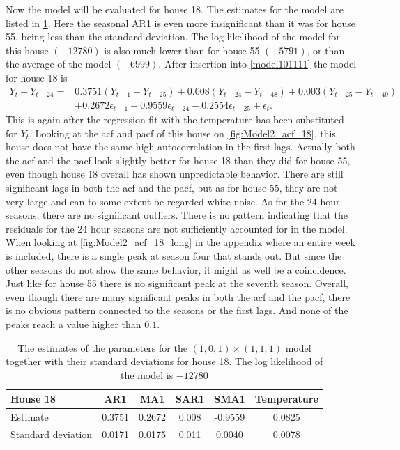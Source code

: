 \noindent Now the model will be evaluated for house 18. The estimates for the model are listed in \cref{tab:ParamSig_House18}. Here the seasonal AR1 is even more insignificant than it was for house 55, being less than the standard deviation. The log likelihood of the model for this house $(-12780)$ is also much lower than for house 55 $(-5791)$, or than the average of the model $(-6999)$. After insertion into \cref{model101111} the model for house 18 is
\begin{align}
    Y_t-Y_{t-24} = &0.3751 (Y_{t-1}-Y_{t-25}) + 0.008 (Y_{t-24}-Y_{t-48}) + 0.003 (Y_{t-25}-Y_{t-49}) \\  &+ 0.2672 \epsilon_{t-1} - 0.9559 \epsilon_{t-24} - 0.2554 \epsilon_{t-25} + \epsilon_t. \nonumber
\end{align}
This is again after the regression fit with the temperature has been substituted for $Y_t$. Looking at the acf and pacf of this house on \cref{fig:Model2_acf_18}, this house does not have the same high autocorrelation in the first lags. Actually both the acf and the pacf look slightly better for house 18 than they did for house 55, even though house 18 overall has shown unpredictable behavior. There are still significant lags in both the acf and the pacf, but as for house 55, they are not very large and can to some extent be regarded white noise. As for the 24 hour seasons, there are no significant outliers. There is no pattern indicating that the residuals for the 24 hour seasons are not sufficiently accounted for in the model. When looking at \cref{fig:Model2_acf_18_long} in the appendix where an entire week is included, there is a single peak at season four that stands out. But since the other seasons do not show the same behavior, it might as well be a coincidence. Just like for house 55 there is no significant peak at the seventh season. Overall, even though there are many significant peaks in both the acf and the pacf, there is no obvious pattern connected to the seasons or the first lags. And none of the peaks reach a value higher than $0.1$.

 \begin{table}[]
    \centering
    \begin{tabular}{l|ccccc}
    \hline
    \textbf{House 18} & \textbf{AR1} & \textbf{MA1} & \textbf{SAR1} & \textbf{SMA1} & \textbf{Temperature} \\ \hline \hline
    Estimate           & 0.3751 & 0.2672 & 0.008 & -0.9559 & 0.0825      \\
    Standard deviation & 0.0171 & 0.0175 & 0.011 & 0.0040  & 0.0078      \\ \hline
    \end{tabular}
    \caption{The estimates of the parameters for the $(1,0,1)\times (1,1,1)$ model together with their standard deviations for house 18. The log likelihood of the model is $-12780$}
    \label{tab:ParamSig_House18}
    \end{table}


